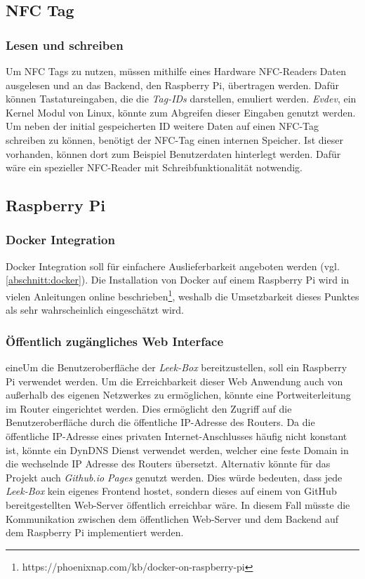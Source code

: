 \documentclass[10pt, a4paper]{article}
\begin{document}
\begin{onehalfspace}
\subsection{NFC Tag}
\subsubsection*{Lesen und schreiben}
Um NFC Tags zu nutzen, müssen mithilfe eines Hardware NFC-Readers Daten ausgelesen und an das Backend, den Raspberry Pi, übertragen werden.
Dafür können Tastatureingaben, die die \textit{Tag-IDs} darstellen, emuliert werden.
\textit{Evdev}, ein Kernel Modul von Linux, könnte zum Abgreifen dieser Eingaben genutzt werden.
\\
Um neben der initial gespeicherten ID weitere Daten auf einen NFC-Tag schreiben zu können, benötigt der NFC-Tag einen internen Speicher.
Ist dieser vorhanden, können dort zum Beispiel Benutzerdaten hinterlegt werden.
Dafür wäre ein spezieller NFC-Reader mit Schreibfunktionalität notwendig.

\subsection{Raspberry Pi}
\subsubsection*{Docker Integration}
Docker Integration soll für einfachere Auslieferbarkeit angeboten werden (vgl. \autoref{abschnitt:docker}).
Die Installation von Docker auf einem Raspberry Pi wird in vielen Anleitungen online beschrieben\footnote{https://phoenixnap.com/kb/docker-on-raspberry-pi}, weshalb die Umsetzbarkeit dieses Punktes als sehr wahrscheinlich eingeschätzt wird.

\subsubsection*{Öffentlich zugängliches Web Interface}
eineUm die Benutzeroberfläche der \textit{Leek-Box} bereitzustellen, soll ein Raspberry Pi verwendet werden.
Um die Erreichbarkeit dieser Web Anwendung auch von außerhalb des eigenen Netzwerkes zu ermöglichen, könnte eine Portweiterleitung im Router eingerichtet werden.
Dies ermöglicht den Zugriff auf die Benutzeroberfläche durch die öffentliche IP-Adresse des Routers.
Da die öffentliche IP-Adresse eines privaten Internet-Anschlusses häufig nicht konstant ist, könnte ein DynDNS Dienst verwendet werden, welcher eine feste Domain in die wechselnde IP Adresse des Routers übersetzt.
Alternativ könnte für das Projekt auch \textit{Github.io Pages} genutzt werden. Dies würde bedeuten, dass jede \textit{Leek-Box} kein eigenes Frontend hostet, sondern dieses auf einem von GitHub bereitgestellten Web-Server öffentlich erreichbar wäre. In diesem Fall müsste die Kommunikation zwischen dem öffentlichen Web-Server und dem Backend auf dem Raspberry Pi implementiert werden.


\end{onehalfspace}
\end{document}
